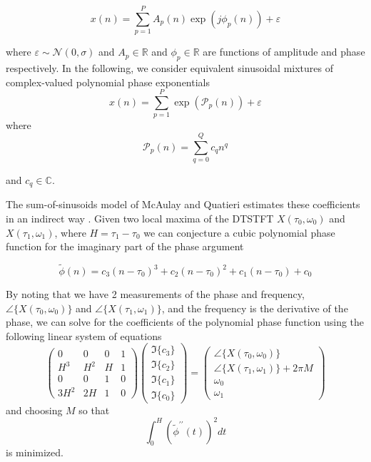 \documentclass[letterpaper,12pt]{report}
\begin{document}
\begin{equation}
    x(n)=\sum_{p=1}^{P} A_p(n) \exp(j \phi_p(n)) + \varepsilon
\end{equation}

where $\varepsilon \sim \mathcal{N}(0,\sigma)$ and $A_p \in \mathbb{R}$ and
$\phi_p \in \mathbb{R}$ are functions of amplitude and phase respectively. In the
following, we consider equivalent sinusoidal mixtures of complex-valued
polynomial phase exponentials
\begin{equation}
    x(n)=\sum_{p=1}^{P} \exp(\mathcal{P}_p(n)) + \varepsilon
\end{equation}
where
\begin{equation}
    \mathcal{P}_p(n) = \sum_{q=0}^{Q} c_q n^{q}
\end{equation}

and $c_q \in \mathbb{C}$.

The sum-of-sinusoids model of McAulay and Quatieri estimates these coefficients
in an indirect way \cite{mcaulay1986speech}. Given two local maxima of the
DTSTFT $X(\tau_0,\omega_0)$ and $X(\tau_1,\omega_1)$, where $H = \tau_1 -
\tau_0$ we can conjecture a cubic
polynomial phase function for the imaginary part of the phase argument

\begin{equation}
    \tilde{\phi}(n) = c_3 (n-\tau_0)^3 + c_2 (n-\tau_0)^2 + c_1 (n-\tau_0) + c_0
\end{equation}

By noting that we have 2 measurements of the phase and frequency,
$\angle\{X(\tau_0,\omega_0)\}$ and $\angle\{X(\tau_1,\omega_1)\}$, and the frequency
is the derivative of the phase, we can solve for the coefficients of the
polynomial phase function using the following linear system of equations
\begin{equation}
    \begin{pmatrix}
        0   & 0     & 0 & 1 \\
        H^3 & H^2   & H & 1 \\
        0   & 0     & 1 & 0 \\
        3 H^2 & 2 H & 1 & 0
    \end{pmatrix}
    \begin{pmatrix}
        \Im\{c_3\} \\
        \Im\{c_2\} \\
        \Im\{c_1\} \\
        \Im\{c_0\}
    \end{pmatrix}
    =
    \begin{pmatrix}
        \angle\{X(\tau_0,\omega_0)\} \\
        \angle\{X(\tau_1,\omega_1)\} + 2 \pi M \\
        \omega_0 \\
        \omega_1        
    \end{pmatrix}
\end{equation}
and choosing $M$ so that
\begin{equation}
    \label{eq:minfmmq}
    \int_{0}^{H}(\tilde{\phi}^{\prime\prime}(t))^{2}dt
\end{equation}
is minimized.
\end{document}
